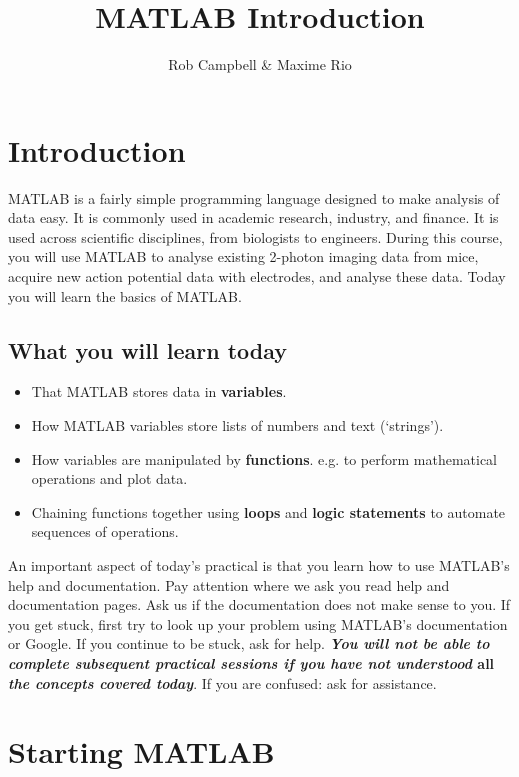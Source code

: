\documentclass{article}
\title{MATLAB Introduction}
\author{Rob Campbell \& Maxime Rio}
\date{}
\begin{document}
\maketitle


\section*{Introduction}

MATLAB is a fairly simple programming language designed to make analysis of data easy.
It is commonly used in academic research, industry, and finance.
It is used across scientific disciplines, from biologists to engineers.
During this course, you will use MATLAB to analyse existing 2-photon imaging data from mice, 
acquire new action potential data with electrodes, and analyse these data.
Today you will learn the basics of MATLAB. 


\subsection*{What you will learn today}
\begin{itemize}
\item That MATLAB stores data in \textbf{variables}.
\item How MATLAB variables store lists of numbers and text (`strings').
\item How variables are manipulated by \textbf{functions}. e.g. to perform mathematical operations and plot data. 
\item Chaining functions together using \textbf{loops} and \textbf{logic statements} to automate sequences of operations.
\end{itemize}

An important aspect of today's practical is that you learn how to use MATLAB's help and documentation.
Pay attention where we ask you read help and documentation pages. Ask us if the documentation does not make sense to you.
If you get stuck, first try to look up your problem using MATLAB's documentation or Google. 
If you continue to be stuck, ask for help.
\textbf{\textit{You will not be able to complete subsequent practical sessions if you have not understood} all \textit{the concepts covered today}}. 
If you are confused: ask for assistance.

\pagebreak
\section{Starting MATLAB}
\end{document}
